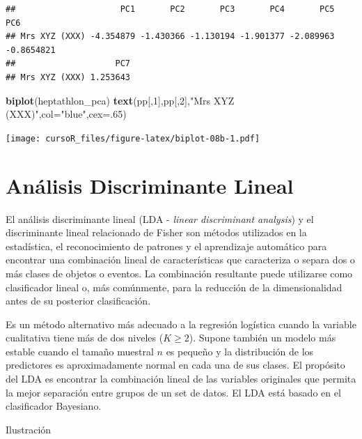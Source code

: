\documentclass[]{book}
\newenvironment{Shaded}{\begin{snugshade}}{\end{snugshade}}
\newcommand{\KeywordTok}[1]{\textcolor[rgb]{0.13,0.29,0.53}{\textbf{#1}}}
\newcommand{\DataTypeTok}[1]{\textcolor[rgb]{0.13,0.29,0.53}{#1}}
\newcommand{\DecValTok}[1]{\textcolor[rgb]{0.00,0.00,0.81}{#1}}
\newcommand{\StringTok}[1]{\textcolor[rgb]{0.31,0.60,0.02}{#1}}
\newcommand{\NormalTok}[1]{#1}
\begin{document}
\begin{verbatim}
##                     PC1       PC2       PC3       PC4       PC5        PC6
## Mrs XYZ (XXX) -4.354879 -1.430366 -1.130194 -1.901377 -2.089963 -0.8654821
##                    PC7
## Mrs XYZ (XXX) 1.253643
\end{verbatim}

\begin{Shaded}
\begin{Highlighting}[]
\KeywordTok{biplot}\NormalTok{(heptathlon_pca)}
\KeywordTok{text}\NormalTok{(pp[,}\DecValTok{1}\NormalTok{],pp[,}\DecValTok{2}\NormalTok{],}\StringTok{"Mrs XYZ (XXX)"}\NormalTok{,}\DataTypeTok{col=}\StringTok{"blue"}\NormalTok{,}\DataTypeTok{cex=}\NormalTok{.}\DecValTok{65}\NormalTok{)}
\end{Highlighting}
\end{Shaded}

\texttt{[image: cursoR\_files/figure-latex/biplot-08b-1.pdf]}

\section{Análisis Discriminante
Lineal}\label{anuxe1lisis-discriminante-lineal}

El análisis discriminante lineal (LDA - \emph{linear discriminant
analysis}) y el discriminante lineal relacionado de Fisher son métodos
utilizados en la estadística, el reconocimiento de patrones y el
aprendizaje automático para encontrar una combinación lineal de
características que caracteriza o separa dos o más clases de objetos o
eventos. La combinación resultante puede utilizarse como clasificador
lineal o, más comúnmente, para la reducción de la dimensionalidad antes
de su posterior clasificación.

Es un método alternativo más adecuado a la regresión logística cuando la
variable cualitativa tiene más de dos niveles (\(K \geq 2\)). Supone
también un modelo más estable cuando el tamaño muestral \(n\) es pequeño
y la distribución de los predictores es aproximadamente normal en cada
una de sus clases. El propósito del LDA es encontrar la combinación
lineal de las variables originales que permita la mejor separación entre
grupos de un set de datos. El LDA está basado en el clasificador
Bayesiano.

Ilustración
\end{document}
